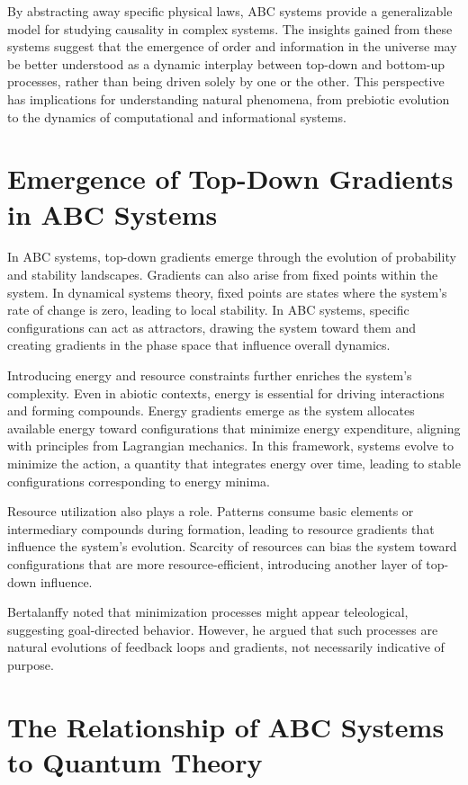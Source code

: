 \documentclass[entropy,article,submit,pdftex,moreauthors]{Definitions/mdpi}
\begin{document}
By abstracting away specific physical laws, ABC systems provide a generalizable model for studying causality in complex systems. The insights gained from these systems suggest that the emergence of order and information in the universe may be better understood as a dynamic interplay between top-down and bottom-up processes, rather than being driven solely by one or the other. This perspective has implications for understanding natural phenomena, from prebiotic evolution to the dynamics of computational and informational systems.

\section{Emergence of Top-Down Gradients in ABC Systems}

In ABC systems, top-down gradients emerge through the evolution of probability and stability landscapes. Gradients can also arise from fixed points within the system. In dynamical systems theory, fixed points are states where the system's rate of change is zero, leading to local stability. In ABC systems, specific configurations can act as attractors, drawing the system toward them and creating gradients in the phase space that influence overall dynamics.

Introducing energy and resource constraints further enriches the system's complexity. Even in abiotic contexts, energy is essential for driving interactions and forming compounds. Energy gradients emerge as the system allocates available energy toward configurations that minimize energy expenditure, aligning with principles from Lagrangian mechanics. In this framework, systems evolve to minimize the action, a quantity that integrates energy over time, leading to stable configurations corresponding to energy minima. 

Resource utilization also plays a role. Patterns consume basic elements or intermediary compounds during formation, leading to resource gradients that influence the system's evolution. Scarcity of resources can bias the system toward configurations that are more resource-efficient, introducing another layer of top-down influence.

Bertalanffy \cite{bertalanffy1968general} noted that minimization processes might appear teleological, suggesting goal-directed behavior. However, he argued that such processes are natural evolutions of feedback loops and gradients, not necessarily indicative of purpose.

\section{The Relationship of ABC Systems to Quantum Theory}
\end{document}
